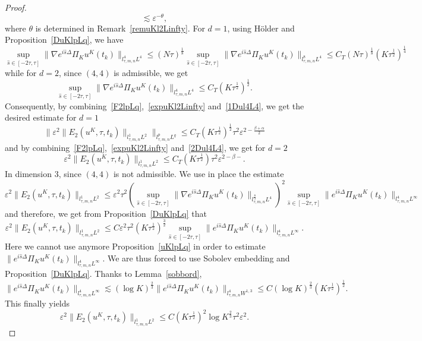 \documentclass[10pt,a4paper]{article}
\begin{document}
\begin{proof}
\begin{equation}
      \lesssim \varepsilon^{-\theta},
    \end{equation}
    where \(\theta\) is determined in Remark~\ref{remuKl2Linfty}.
    For \(d=1\), using H\"older and Proposition~\ref{DuKlpLq}, we have
    \begin{equation}\label{1Dul4L4}
      \sup_{\hat{s} \in [-2\tau,\tau]} \|\nabla e^{i\hat{s}\Delta}\Pi_K u^K(t_k)\|_{l^4_{\tau,m,n}L^4}
    \leq (N\tau)^\frac18 \sup_{\hat{s} \in [-2\tau,\tau]} \|\nabla e^{i\hat{s}\Delta}\Pi_K u^K(t_k)\|_{l^8_{\tau,m,n}L^4}
    \leq C_T (N\tau)^\frac18 (K\tau^\frac12)^\frac14
    \end{equation}
    while for \(d=2\), since \((4,4)\) is admissible, we get 
    \begin{equation}\label{2Dul4L4}
      \sup_{\hat{s} \in [-2\tau,\tau]} \|\nabla e^{i\hat{s}\Delta}\Pi_K u^K(t_k)\|_{l^4_{\tau,m,n}L^4}
    \leq C_T (K\tau^\frac12)^\frac12.
    \end{equation}
    Consequently, by combining~\eqref{F2lpLq},~\eqref{expuKl2Linfty} and~\eqref{1Dul4L4},
    we get the desired estimate for \(d=1\)
    \[ \|\varepsilon^2 \|E_2(u^K,\tau,t_k)\|_{l^1_{\tau,m,n}L^2}\|_{l^p_{\tau,m,n}L^q} 
    \leq C_T (K\tau^\frac12)^\frac12 \tau^2
    \varepsilon^{2-\frac{\beta+\alpha}2}
    \]
    and by combining~\eqref{F2lpLq},~\eqref{expuKl2Linfty} and~\eqref{2Dul4L4},
    we get for \(d=2\)
    \[ \varepsilon^2 \|E_2(u^K,\tau,t_k)\|_{l^1_{\tau,m,n}L^2}
    \leq C_T (K\tau^\frac12) \tau^2 \varepsilon^{2-\beta-} . \]
    In dimension \(3\), since \((4,4)\) is not admissible. We use in place the
    estimate 
    \begin{equation}
      \varepsilon^2 \|E_2(u^K,\tau,t_k)\|_{l^1_{\tau,m,n}L^2} \leq \varepsilon^2 \tau^2
      \left(\sup_{\hat s \in [-2\tau, \tau]} 
      \|\nabla e^{i\hat s\Delta}\Pi_{K}u^K(t_k)\|_{l^\frac83_{\tau,m,n}L^4} \right)^2 
      \sup_{\hat s \in [-2\tau, \tau]} \|e^{i\hat s\Delta }\Pi_K u^K(t_k)\|_{l^4_{\tau,m,n}L^\infty}
    \end{equation}
    and therefore, we get from Proposition~\ref{DuKlpLq} that 
    \[ \varepsilon^2 \|E_2(u^K,\tau,t_k)\|_{l^1_{\tau,m,n}L^2} \leq C \varepsilon^2 \tau^2
    (K\tau^\frac12)^\frac32 
    \sup_{\hat s \in [-2\tau, \tau]} \|e^{i\hat s\Delta }\Pi_K u^K(t_k)\|_{l^4_{\tau,m,n}L^\infty} .\]
    Here we cannot use anymore Proposition~\ref{uKlpLq} in order to estimate 
    \(\|e^{i \hat s\Delta }\Pi_{K} u^K(t_{k})\|_{l^4_{\tau,m,n}L^\infty}\). We 
    are thus forced to use Sobolev embedding and Proposition~\ref{DuKlpLq}. 
    Thanks to Lemma~\ref{sobbord}, 
    \[ \|e^{i\hat s\Delta }\Pi_K u^K(t_k)\|_{l^4_{\tau,m,n}L^\infty} \lesssim 
    (\log K)^\frac23 \|e^{i\hat s\Delta }\Pi_K u^K(t_k)\|_{l^4_{\tau,m,n}W^{1,3}}
    \leq C (\log K)^\frac23 (K\tau^\frac12)^\frac12 .\]
    This finally yields 
    \[ \varepsilon^2 \|E_2(u^K,\tau,t_k)\|_{l^1_{\tau,m,n}L^2} \leq C (K\tau^\frac12)^2 \log{K}^\frac23
    \tau^2 \varepsilon^2.\]
  \end{proof}
\end{document}

